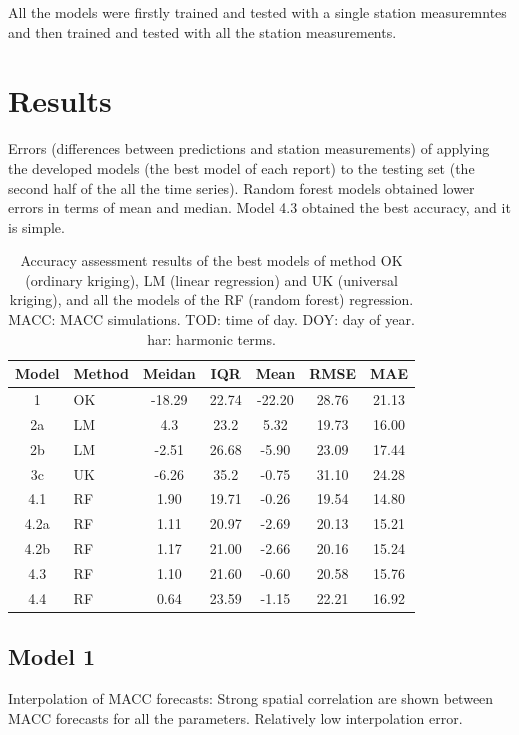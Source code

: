 \documentclass{article}
\begin{document}
All the models were firstly trained and tested with a single station measuremntes and then trained and tested with all the station measurements.    


\section{Results}

Errors (differences between predictions and station measurements) of applying the developed models (the best model of each report) to the testing set (the second half of the all the time series). Random forest models obtained lower errors in terms of mean and median. Model 4.3 obtained the best accuracy, and it is simple.  
\begin{table}[h!]
\centering
\begin{tabular}{ c l c c c c c}
 Model &Method & Meidan & IQR& Mean&  RMSE& MAE \\
 \hline
 1     &OK       & -18.29 &	22.74&	-22.20 &	28.76 &	21.13\\
 2a    &LM            & 4.3   & 23.2     & 5.32 & 19.73 & 16.00 \\
 2b    &LM  & -2.51 & 26.68 & -5.90 & 23.09 & 17.44\\ 
 3c    &UK         & -6.26 & 35.2 & -0.75 & 31.10 & 24.28\\
 4.1   &RF   &  1.90 & 19.71  & -0.26 & 19.54 & 14.80 \\
 4.2a  &RF              & 1.11& 20.97 & -2.69& 20.13 & 15.21  \\
 4.2b  &RF   & 1.17 & 21.00  & -2.66 & 20.16 & 15.24 \\
 4.3   &RF         & 1.10 & 21.60  & -0.60  & 20.58 & 15.76\\
 4.4   &RF              & 0.64 & 23.59  & -1.15  & 22.21 & 16.92 \\
\hline
\end{tabular}
\caption{Accuracy assessment results of the best models of method OK (ordinary kriging), LM (linear regression) and UK (universal kriging), and all the models of the RF (random forest) regression. MACC: MACC simulations. TOD: time of day. DOY: day of year. har: harmonic terms.  
 } 
\label{table:result}
\end{table} 
 
 
 
\subsection{Model 1} 
Interpolation of MACC forecasts: Strong spatial correlation are shown between MACC forecasts for all the parameters. Relatively low interpolation error.
\end{document}
